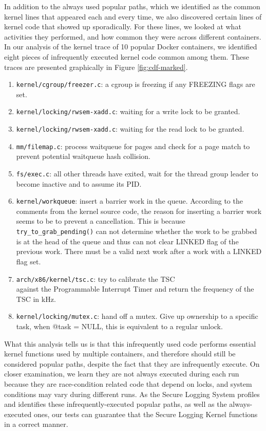 In addition to the always used popular paths, which we identified as the common kernel lines that appeared each and every time, 
we also discovered certain lines of kernel code that showed up sporadically. 
For these lines, we looked at what activities they performed, and how common they were across different containers. 
In our analysis of the kernel trace of 10 popular Docker containers, we identified eight pieces of infrequently executed kernel code common among them. 
These traces are presented graphically in Figure \ref{fig:cdf-marked}. 
\begin{enumerate}
	\item \verb|kernel/cgroup/freezer.c|: a cgroup is freezing if any FREEZING flags are set.
	\item \verb|kernel/locking/rwsem-xadd.c|: waiting for a write lock to be granted. 
	\item \verb|kernel/locking/rwsem-xadd.c|: waiting for the read lock to be granted.
	\item \verb|mm/filemap.c|: process waitqueue for pages and check for a page match to prevent potential waitqueue hash collision. 
	\item \verb|fs/exec.c|: all other threads have exited, wait for the thread group leader to become inactive and to assume its PID. 
	\item \verb|kernel/workqueue|: insert a barrier work in the queue. According to the comments from the kernel source code, 
	the reason for inserting a barrier work seems to be to prevent a cancellation. 
	This is because \\
	\verb|try_to_grab_pending()| can not determine whether the work to be grabbed is at the head of the queue and thus can not clear LINKED flag of the previous work. 
	There must be a valid next work after a work with a LINKED flag set. 
	\item \verb|arch/x86/kernel/tsc.c|: try to calibrate the TSC \\ 
	against the Programmable Interrupt Timer and return the frequency of the TSC in kHz. 
	\item \verb|kernel/locking/mutex.c|: hand off a mutex. Give up ownership to a specific task, when @task = NULL, this is equivalent to a regular unlock.
\end{enumerate}

What this analysis tells us is that this infrequently used code performs essential kernel functions used by multiple containers, and therefore should still be considered popular paths, 
despite the fact that they are infrequently execute. 
On closer examination, we learn they are not always executed during each run because they are race-condition related code that depend on locks, and system conditions may vary during different runs. 
As the Secure Logging System profiles and identifies these infrequently-executed popular paths, as well as the always-executed ones, 
our tests can guarantee that the Secure Logging Kernel functions in a correct manner.

